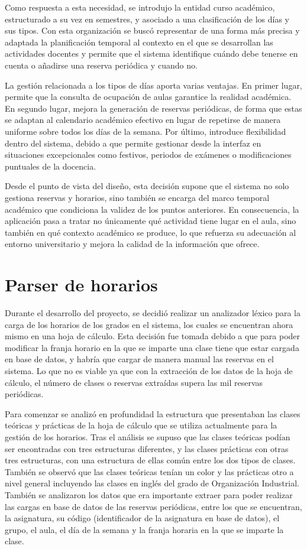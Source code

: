 Como respuesta a esta necesidad, se introdujo la entidad curso académico, estructurado a su vez en semestres, y asociado a una clasificación de los días y sus tipos. Con esta organización se buscó representar de una forma más precisa y adaptada la planificación temporal al contexto en el que se desarrollan las actividades docentes y permite que el sistema identifique cuándo debe tenerse en cuenta o añadirse una reserva periódica y cuando no.

La gestión relacionada a los tipos de días aporta varias ventajas. En primer lugar, permite que la consulta de ocupación de aulas garantice la realidad académica. En segundo lugar, mejora la generación de reservas periódicas, de forma que estas se adaptan al calendario académico efectivo en lugar de repetirse de manera uniforme sobre todos los días de la semana. Por último, introduce flexibilidad dentro del sistema, debido a que permite gestionar desde la interfaz en situaciones excepcionales como festivos, periodos de exámenes o modificaciones puntuales de la docencia.

Desde el punto de vista del diseño, esta decisión supone que el sistema no solo gestiona reservas y horarios, sino también se encarga del marco temporal académico que condiciona la validez de los puntos anteriores. En consecuencia, la aplicación pasa a tratar no únicamente qué actividad tiene lugar en el aula, sino también en qué contexto académico se produce, lo que refuerza su adecuación al entorno universitario y mejora la calidad de la información que ofrece.

\section{Parser de horarios}
Durante el desarrollo del proyecto, se decidió realizar un analizador léxico para la carga de los horarios de los grados en el sistema, los cuales se encuentran ahora mismo en una hoja de cálculo. Esta decisión fue tomada debido a que para poder modificar la franja horario en la que se imparte una clase tiene que estar cargada en base de datos, y habría que cargar de manera manual las reservas en el sistema. Lo que no es viable ya que con la extracción de los datos de la hoja de cálculo, el número de clases o reservas extraídas supera las mil reservas periódicas.

Para comenzar se analizó en profundidad la estructura que presentaban las clases teóricas y prácticas de la hoja de cálculo que se utiliza actualmente para la gestión de los horarios. Tras el análisis se supuso que las clases teóricas podían ser encontradas con tres estructuras diferentes, y las clases prácticas con otras tres estructuras, con una estructura de ellas común entre los dos tipos de clases. También se observó que las clases teóricas tenían un color y las prácticas otro a nivel general incluyendo las clases en inglés del grado de Organización Industrial. También se analizaron los datos que era importante extraer para poder realizar las cargas en base de datos de las reservas periódicas, entre los que se encuentran, la asignatura, su código (identificador de la asignatura en base de datos), el grupo, el aula, el día de la semana y la franja horaria en la que se imparte la clase. 

